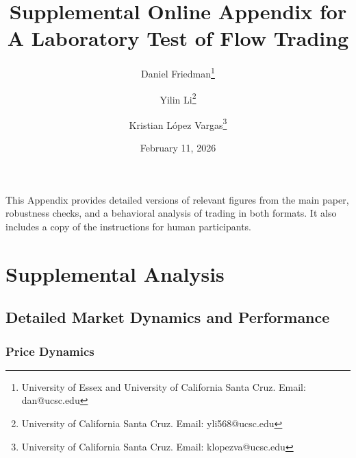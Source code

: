 \documentclass[12pt]{article}
\title{Supplemental Online Appendix for \\
A Laboratory Test of Flow Trading}
\author{
  Daniel Friedman\thanks{
  University of Essex and University of California Santa Cruz. Email: dan@ucsc.edu}
\and
  Yilin Li\thanks{
  University of California Santa Cruz. Email: yli568@ucsc.edu}
\and
  Kristian L\'opez Vargas\thanks{
  University of California Santa Cruz. Email: klopezva@ucsc.edu}}
\date{February 11, 2026}
\begin{document}
\maketitle

\begin{singlespace}
\appendix
\setcounter{subsection}{0}
\setcounter{section}{0}  %
\setcounter{page}{0}

\newpage

This Appendix provides detailed versions of relevant figures from the main paper, robustness checks, and a behavioral analysis of trading in both formats. 
It also includes a copy of the instructions for human participants. 

\section*{Supplemental Analysis} \label{app_supplementary_analysis}

\subsection{Detailed Market Dynamics and Performance}

\subsubsection{Price Dynamics}


\end{singlespace}
\end{document}

